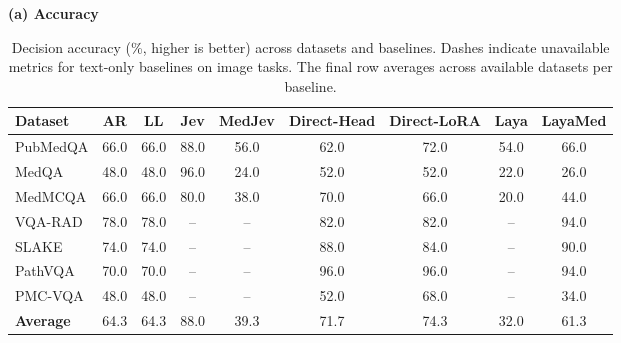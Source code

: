 \begin{table}[t]
\centering
\small
\setlength{\tabcolsep}{3pt}
\renewcommand{\arraystretch}{1.13}
\caption{Decision accuracy (\%, higher is better) across datasets and baselines. Dashes indicate unavailable metrics for text-only baselines on image tasks. The final row averages across available datasets per baseline.}
\label{tab:accuracy}
\textbf{(a) Accuracy}\par\smallskip
\scriptsize
\setlength{\tabcolsep}{2pt}
\begin{tabular*}{\textwidth}{@{\extracolsep{\fill}}lcccccccc@{}}
\toprule
\textbf{Dataset} & \textbf{AR} & \textbf{LL} & \textbf{Jev} & \textbf{MedJev} & \textbf{Direct-Head} & \textbf{Direct-LoRA} & \textbf{Laya} & \textbf{LayaMed} \\
\midrule
PubMedQA & 66.0 & 66.0 & 88.0 & 56.0 & 62.0 & 72.0 & 54.0 & 66.0 \\
MedQA & 48.0 & 48.0 & 96.0 & 24.0 & 52.0 & 52.0 & 22.0 & 26.0 \\
MedMCQA & 66.0 & 66.0 & 80.0 & 38.0 & 70.0 & 66.0 & 20.0 & 44.0 \\
VQA-RAD & 78.0 & 78.0 & -- & -- & 82.0 & 82.0 & -- & 94.0 \\
SLAKE & 74.0 & 74.0 & -- & -- & 88.0 & 84.0 & -- & 90.0 \\
PathVQA & 70.0 & 70.0 & -- & -- & 96.0 & 96.0 & -- & 94.0 \\
PMC-VQA & 48.0 & 48.0 & -- & -- & 52.0 & 68.0 & -- & 34.0 \\
\midrule
\textbf{Average} & 64.3 & 64.3 & 88.0 & 39.3 & 71.7 & 74.3 & 32.0 & 61.3 \\
\bottomrule
\end{tabular*}
\end{table}
